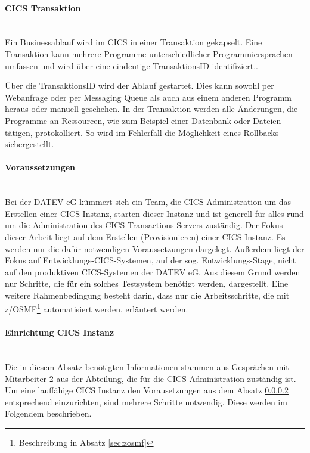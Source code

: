 \paragraph{CICS Transaktion}\label{subsec:trans} ~\\
Ein Businessablauf wird im CICS in einer Transaktion gekapselt.
Eine Transaktion kann mehrere Programme unterschiedlicher Programmiersprachen umfassen und wird über eine eindeutige \glqq TransaktionsID\grqq{} identifiziert..

Über die TransaktionsID wird der Ablauf gestartet.
Dies kann sowohl per Webanfrage oder per Messaging Queue als auch aus einem anderen Programm heraus oder manuell geschehen.
In der Transaktion werden alle Änderungen, die Programme an Ressourcen, wie zum Beispiel einer Datenbank oder Dateien tätigen, protokolliert.
So wird im Fehlerfall die Möglichkeit eines Rollbacks sichergestellt.
 \cite{Rayns.2011}

\paragraph{Voraussetzungen}\label{subsec:voraus} ~\\
Bei der DATEV eG kümmert sich ein Team, die \glqq CICS Administration\grqq{} um das Erstellen einer CICS-Instanz, starten dieser Instanz und ist generell für alles rund um die Administration des CICS Transactions Servers zuständig.
Der Fokus dieser Arbeit liegt auf dem Erstellen (\glqq Provisionieren\grqq{}) einer CICS-Instanz. Es werden nur die dafür notwendigen Voraussetzungen dargelegt.
Außerdem liegt der Fokus auf Entwicklungs-CICS-Systemen, auf der sog. Entwicklungs-Stage, nicht auf den produktiven CICS-Systemen der DATEV eG. 
Aus diesem Grund werden nur Schritte, die für ein solches Testsystem benötigt werden, dargestellt.
Eine weitere Rahmenbedingung besteht darin, dass nur die Arbeitsschritte, die mit z/OSMF\footnote{Beschreibung in Absatz \ref{sec:zosmf}} automatisiert werden, erläutert werden.

\paragraph{Einrichtung CICS Instanz}\label{subsec:createCICS}~\\
Die in diesem Absatz benötigten Informationen stammen aus Gesprächen mit Mitarbeiter 2 aus der Abteilung, die für die CICS Administration zuständig ist.
Um eine lauffähige CICS Instanz den Vorausetzungen aus dem Absatz \ref{subsec:voraus} entsprechend einzurichten, sind mehrere Schritte notwendig.
Diese werden im Folgendem beschrieben.


